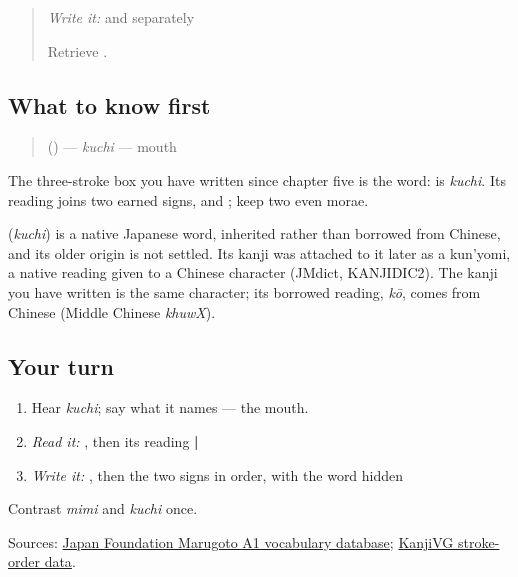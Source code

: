 \begin{quote}
\emph{Write it:} \textbf{} and \textbf{} separately

Retrieve \textbf{}.
\end{quote}

\subsection*{What to know first}
\begin{quote}
\textbf{} () — \emph{kuchi} — mouth
\end{quote}

The three-stroke box you have written since chapter five is the word: \textbf{} is \emph{kuchi}. Its reading joins two earned signs, \textbf{} and \textbf{}; keep two even morae.

\begin{cousinweb}
\textbf{} (\emph{kuchi}) is a native Japanese word, inherited rather than borrowed from Chinese, and its older origin is not settled. Its kanji was attached to it later as a kun'yomi, a native reading given to a Chinese character (JMdict, KANJIDIC2). The kanji \textbf{} you have written is the same character; its borrowed reading, \emph{kō}, comes from Chinese (Middle Chinese \emph{khuwX}).
\end{cousinweb}

\subsection*{Your turn}
\begin{enumerate}
\raggedright
  \item Hear \emph{kuchi}; say what it names — the mouth.
  \item \emph{Read it:} \textbf{}, then its reading \textbf{ | }
  \item \emph{Write it:} \textbf{}, then the two signs in order, with the word hidden
\end{enumerate}

\begin{tcolorbox}[breakable,colback=teal!4,colframe=teal!35!black,title={Before you move on}]
Contrast \emph{mimi} and \emph{kuchi} once.

Sources: \href{https://words.marugotoweb.jp/}{Japan Foundation Marugoto A1 vocabulary database}; \href{https://kanjivg.tagaini.net/kanjivg/kanji/053e3.html}{KanjiVG stroke-order data}.
\end{tcolorbox}
